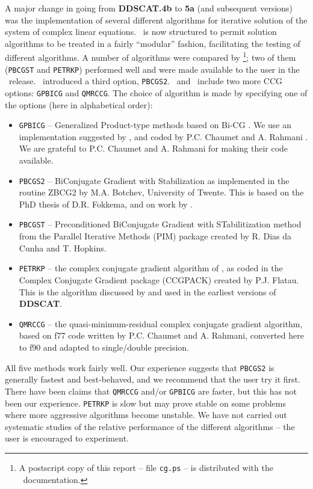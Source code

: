 A major change in going from {{\bf DDSCAT}}{\bf .4b} to {\bf 5a} (and
subsequent versions) was the implementation of several different
algorithms for iterative solution of the system of complex linear
equations.  \ddscatv\ is now
structured to permit solution algorithms to be treated in a fairly
``modular'' fashion, facilitating the testing of different algorithms.
A number of algorithms were compared by \citet{Flatau_1997}\footnote{ A postscript
copy of this report -- file {\tt cg.ps} -- is distributed with the
\ddscatv\ documentation.}; two of them ({\tt PBCGST} and {\tt PETRKP}) 
performed well and were
made available to the user in the \ddscatsixzero\ release.
\ddscatsevenone\ introduced a third option, {\tt PBCGS2}.
\ddscatseventwo\ and \ddscatseventhree\ include 
two more CCG options: {\tt GPBICG} and {\tt QMRCCG}.
The choice of algorithm is made by specifying one of the options (here in
alphabetical order):
\begin{itemize}
\item {\tt GPBICG} -- Generalized Product-type methods based on Bi-CG
      \citet{Zhang_1997}.  We use an implementation suggested by
      \citet{Tang+Shen+Zheng+Qiu_2004}, and coded by P.C. Chaumet and
      A. Rahmani \citep{Chaumet+Rahmani_2009}.
      We are grateful to P.C. Chaumet and A. Rahmani for making their
      code available.
      
\item {\tt PBCGS2} --  BiConjugate Gradient with Stabilization as implemented 
      in the routine ZBCG2 by M.A. Botchev, University of Twente.
      This is based on the PhD thesis of D.R. Fokkema, and on work
      by \citet{Sleijpen+vanderVorst_1995,Sleijpen+vanderVorst_1996}.
\item {\tt PBCGST} -- Preconditioned BiConjugate Gradient with 
	STabilitization method from the Parallel Iterative Methods 
	(PIM) package created by R. Dias da Cunha and T. Hopkins.
\item {\tt PETRKP} -- the complex conjugate gradient algorithm of 
	\citet{Petravic+Kuo-Petravic_1979}, as coded in the Complex Conjugate 
	Gradient package (CCGPACK) created by P.J. Flatau.
	This is the algorithm discussed by \citet{Draine_1988} and used in 
	the earliest versions of {{\bf DDSCAT}}.
\item {\tt QMRCCG} -- the quasi-minimum-residual complex conjugate
       gradient algorithm, based on f77 code written by
       P.C. Chaumet and A. Rahmani, converted here to f90 and adapted
       to single/double precision.
\end{itemize}
All five methods work fairly well.
Our experience suggests that {\tt PBCGS2} is generally fastest and 
best-behaved, and we recommend that the user try it first.
There have been claims that {\tt QMRCCG} and/or {\tt GPBICG}
are faster, but this has not been our experience.
{\tt PETRKP} is slow but may prove stable on some problems where
more aggressive algorithms become unstable.  
We have not carried out systematic studies of the relative performance
of the different algorithms -- the user is encouraged to experiment.

